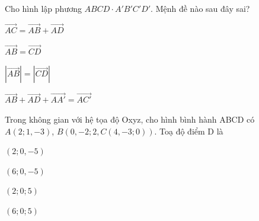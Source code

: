 \begin{question}[type=multiple_choice,difficulty=2,code={I-9}]
Cho hình lập phương $ ABCD \cdot A'B'C'D' $. Mệnh đề nào sau đây sai?

\begin{choice}[label=A]
$ \overrightarrow{AC} = \overrightarrow{AB} + \overrightarrow{AD} $
\end{choice}

\begin{choice}[correct,label=B]
$ \overrightarrow{AB} = \overrightarrow{CD} $
\end{choice}

\begin{choice}[label=C]
$ \left|\overrightarrow{AB}\right| = \left|\overrightarrow{CD}\right| $
\end{choice}

\begin{choice}[label=D]
$ \overrightarrow{AB} + \overrightarrow{AD} + \overrightarrow{AA'} = \overrightarrow{AC'} $
\end{choice}

\end{question}

\begin{question}[type=multiple_choice,difficulty=2,code={I-10}]
Trong không gian với hệ tọa độ Oxyz, cho hình bình hành ABCD có $ A(2;1,-3) $, $ B(0,-2;2,C(4,-3;0)) $. Toạ độ điểm D là

\begin{choice}[label=A]
$ (2;0,-5) $
\end{choice}

\begin{choice}[correct,label=B]
$ (6;0,-5) $
\end{choice}

\begin{choice}[label=C]
$ (2;0;5) $
\end{choice}

\begin{choice}[label=D]
$ (6;0;5) $
\end{choice}

\end{question}


